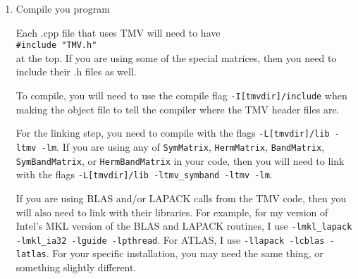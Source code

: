 \documentclass[twoside,letterpaper,11pt]{article}
\renewcommand{\tt}[1]{{\texttt {#1}}}
\begin{document}
\begin{enumerate}
\item
Compile you program

Each .cpp file that uses TMV will need to have \\
\tt{\#include "TMV.h"}\\
at the top.
If you are using some of the special matrices, then you need to include their 
.h files as well.

To compile, you will need to use the compile flag
\tt{-I[tmvdir]/include} when making the object file to tell the 
compiler where the TMV header files are.

For the linking step, you need to compile with the flags
\tt{-L[tmvdir]/lib -ltmv -lm}.
If you are using any of \tt{SymMatrix}, \tt{HermMatrix}, \tt{BandMatrix}, 
\tt{SymBandMatrix}, or \tt{HermBandMatrix} in your code, then you will 
need to link with the flags \tt{-L[tmvdir]/lib -ltmv\_symband -ltmv -lm}.

If you are using BLAS and/or LAPACK calls from the TMV code,
then you will also need to 
link with their libraries.  
For example, for my version of Intel's MKL version of the BLAS and LAPACK
routines, I use 
\tt{-lmkl\_lapack -lmkl\_ia32 -lguide -lpthread}.  
For ATLAS,
I use \tt{-llapack -lcblas -latlas}.  For your specific installation, you may need 
the same thing, or something slightly different.

\end{enumerate}
\end{document}
